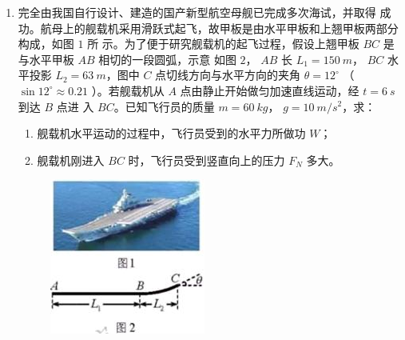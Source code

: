 \begin{enumerate}
\begin{enumerate}




\end{enumerate}




\newpage
\item 
{}
完全由我国自行设计、建造的国产新型航空母舰已完成多次海试，并取得
成功。航母上的舰载机采用滑跃式起飞，故甲板是由水平甲板和上翘甲板两部分构成，如图 $ 1 $ 所
示。为了便于研究舰载机的起飞过程，假设上翘甲板 $ BC $ 是与水平甲板 $ AB $ 相切的一段圆弧，示意
如图 $ 2 $， $ AB $ 长 $ L_{1} =150 \ m $， $ BC $ 水平投影 $ L_{2} =63 \ m $，图中 $ C $ 点切线方向与水平方向的夹角
$ \theta=12 ^{ \circ } $ （ $ \sin 12 ^{ \circ } \approx 0.21 $ ）。若舰载机从 $ A $ 点由静止开始做匀加速直线运动，经 $ t=6 \ s $ 到达 $ B $ 点进
入 $ BC $。已知飞行员的质量 $ m=60 \ kg $， $ g=10 \ m/s^{2} $，求：
\begin{enumerate}
\renewcommand{\labelenumi}{\arabic{enumi}.}
\item
舰载机水平运动的过程中，飞行员受到的水平力所做功 $ W $；
\item 
舰载机刚进入 $ BC $ 时，飞行员受到竖直向上的压力 $ F_{N} $ 多大。




\end{enumerate}
\begin{figure}[h!]
\flushright 
\includegraphics[width=0.3\linewidth]{picture/screenshot027}
\end{figure}


\end{enumerate}
